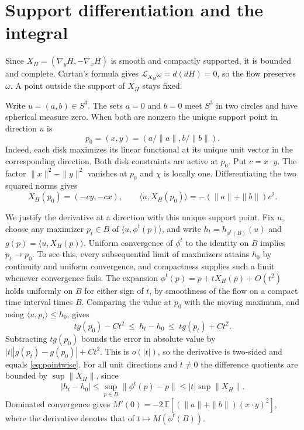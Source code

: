 \documentclass[11pt,a4paper]{amsart}
\newcommand{\E}{\mathbb E}
\newcommand{\ip}[2]{\langle #1,#2\rangle}
\begin{document}
\section{Support differentiation and the integral}
Since $X_H=(\nabla_yH,-\nabla_xH)$ is smooth and compactly supported, it is bounded and complete. Cartan's formula gives $\mathcal L_{X_H}\omega=d(dH)=0$, so the flow preserves $\omega$. A point outside the support of $X_H$ stays fixed.

Write $u=(a,b)\in S^3$. The sets $a=0$ and $b=0$ meet $S^3$ in two circles and have spherical measure zero. When both are nonzero the unique support point in direction $u$ is
\[
            p_0=(x,y)=(a/\|a\|,b/\|b\|).
\]
Indeed, each disk maximizes its linear functional at its unique unit vector in the corresponding direction. Both disk constraints are active at $p_0$. Put $c=x\cdot y$. The factor $\|x\|^2-\|y\|^2$ vanishes at $p_0$ and $\chi$ is locally one. Differentiating the two squared norms gives
\begin{equation}\label{eq:pointwise}
 X_H(p_0)=(-cy,-cx),\qquad
 \ip{u}{X_H(p_0)}=-(\|a\|+\|b\|)c^2 .
\end{equation}

We justify the derivative at a direction with this unique support point. Fix $u$, choose any maximizer $p_t\in B$ of $\ip{u}{\phi^t(p)}$, and write $h_t=h_{\phi^t(B)}(u)$ and $g(p)=\ip{u}{X_H(p)}$. Uniform convergence of $\phi^t$ to the identity on $B$ implies $p_t\to p_0$. To see this, every subsequential limit of maximizers attains $h_0$ by continuity and uniform convergence, and compactness supplies such a limit whenever convergence fails. The expansion $\phi^t(p)=p+tX_H(p)+O(t^2)$ holds uniformly on $B$ for either sign of $t$, by smoothness of the flow on a compact time interval times $B$. Comparing the value at $p_0$ with the moving maximum, and using $\ip{u}{p_t}\le h_0$, gives
\[
 t g(p_0)-C t^2 \ \le\ h_t-h_0\ \le\ t g(p_t)+C t^2 .
\]
Subtracting $t g(p_0)$ bounds the error in absolute value by $|t||g(p_t)-g(p_0)|+Ct^2$. This is $o(|t|)$, so the derivative is two-sided and equals \eqref{eq:pointwise}. For all unit directions and $t\ne0$ the difference quotients are bounded by $\sup\|X_H\|$, since
\[
 |h_t-h_0|\le\sup_{p\in B}\|\phi^t(p)-p\|
            \le |t|\sup\|X_H\| .
\]
Dominated convergence gives $M'(0)=-2\,\E[(\|a\|+\|b\|)(x\cdot y)^2]$, where the derivative denotes that of $t\mapsto M(\phi^t(B))$.
\end{document}
